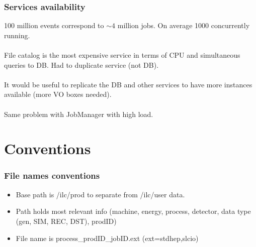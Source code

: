 \documentclass{beamer}
\begin{document}
\begin{frame}
\frametitle{Services availability}
100 million events correspond to $\sim 4$ million jobs. On average 1000 concurrently running.\\
~\\
File catalog is the most expensive service in terms of CPU and simultaneous queries to DB. Had to duplicate service (not DB). ~\\
~\\
It would be useful to replicate the DB and other services to have more instances available (more VO boxes needed).~\\
~\\
Same problem with JobManager with high load.
\end{frame}

\section{Conventions}
\begin{frame}
\frametitle{File names conventions}
\begin{itemize}
\item Base path is /ilc/prod to separate from /ilc/user data. 
\item Path holds most relevant info (machine, energy, process, detector, data type (gen, SIM, REC, DST), prodID)
\item File name is process\_prodID\_jobID.ext (ext=stdhep,slcio)
\end{itemize} 
 \end{frame}
\end{document}
